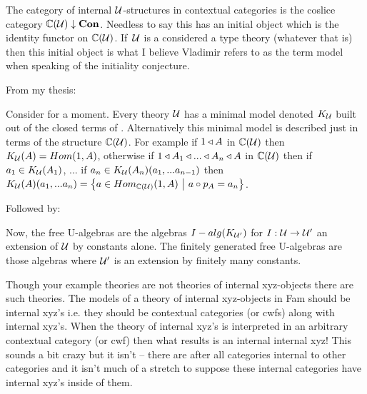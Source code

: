 \note The category of internal $\gat[U]$-structures in contextual categories is the coslice category
$\CofU \downarrow \catCon$. Needless to say this has an initial object which is the identity functor on  $\CofU$.
If\ $\gat[U]$ is a considered a type theory (whatever that is) then this initial object is what I believe Vladimir refers
to as the term model when speaking of the initiality conjecture.



\note From my thesis:
\begin{tightquote}
Consider for a moment. Every theory $\gat[U]$ has a minimal model denoted $\KU$ built out of the closed terms of \gat[U]. Alternatively this minimal model is described just in terms of the structure $\CofU$. For example
if $1 \base A$ in $\CofU$ then 
$\KU(A)=Hom(1,A)$, otherwise if $1 \base A_1 \base ... \base A_n \base A$ in $\CofU$
then if $a_1 \in \KU(A_1)$, ... if $a_n \in \KU(A_n)(a_1,...a_{n-1})$ then 
$\KU(A)(a_1,...a_n)=\setsuchthat{a\in Hom_{\CofU}(1,A)}{a \circ p_A = a_n}$. \\
\end{tightquote} 

Followed by:
\begin{tightquote}
Now, the free U-algebras are the algebras $I-alg(\KUp)$ for $I: \gat[U] \morph \gat[U']$ an extension of $\gat[U]$ by constants alone. The finitely generated free U-algebras are those algebras where $\gat[U']$ is an extension by finitely many constants. \\
\end{tightquote}

\begin{notebox}
Though your example theories are not theories of internal xyz-objects there are such theories.
The models of a theory of internal xyz-objects  in Fam should be  internal xyz's i.e. they should be contextual categories (or cwfs) along with internal xyz's. When the theory of internal xyz's is interpreted in an arbitrary contextual category (or cwf) then what results is an internal internal xyz! This sounds a bit crazy but it isn't -- there are after all categories internal to other categories and it isn't much of a stretch to suppose these internal categories have internal xyz's inside of them. 
\end{notebox}

